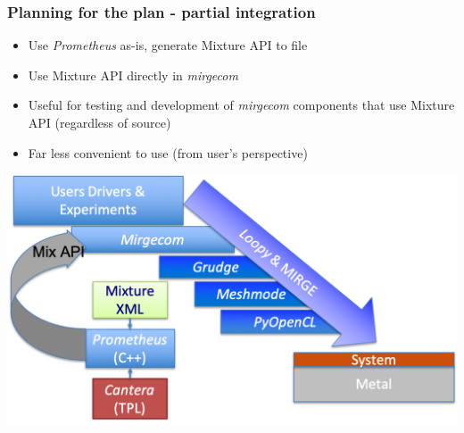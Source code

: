 \begin{frame}\frametitle{Planning for the plan - partial integration}
\begin{multicols}{2}
\begin{itemize}
  \item Use \textit{Prometheus} as-is, generate Mixture API to file 
  \item Use Mixture API directly in \textit{mirgecom}
  \item Useful for testing and development of \textit{mirgecom} components that use Mixture API (regardless of source)
  \item Far less convenient to use (from user's perspective)
\end{itemize}
\end{multicols}
\begin{center}
\includegraphics[width=.8\textwidth]{figures/partial_cartoon.png}
\end{center}
\end{frame}

